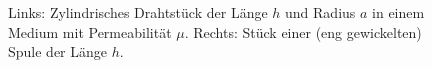 \begin{figure}[htb]
	\centering
	\tfigCylindricalConductorAndCoil
	\caption{Links: Zylindrisches Drahtstück der Länge $h$ und Radius $a$ in einem Medium mit Permeabilität $\mu$. Rechts: Stück einer (eng gewickelten) Spule der Länge $h$. }
	\label{fig:cylindricalConductorAndCoil}
\end{figure}